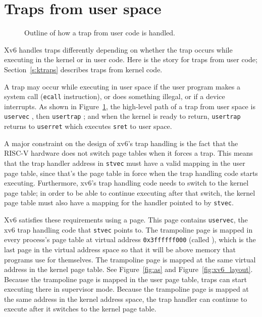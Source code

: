 \section{Traps from user space}
\begin{figure}[t]
  \begin{center}
    
  \end{center}
\caption{Outline of how a trap from user code is handled.}
\label{fig:usertrap}
\end{figure}

Xv6 handles traps differently depending on whether
the trap occurs while
executing in the kernel or in user code. Here is the
story for traps from user code; Section~\ref{s:ktraps}
describes traps from kernel code.

A trap may occur while executing in user space if the
user program makes a
system call ({\tt ecall} instruction), or does something
illegal, or if a device interrupts.
As shown in Figure~\ref{fig:usertrap}, the high-level path of a trap from user space is
{\tt uservec}
,
then {\tt usertrap}
;
and when the kernel is ready to return,
{\tt usertrap}
returns to
{\tt userret}
which executes {\tt sret}
to user space.


A major constraint on the design of xv6's trap handling is the fact
that the RISC-V hardware does not switch page tables when it forces a
trap. This means that the trap handler
address in {\tt stvec} must have a valid
mapping in the user page table, since that's the page table in force
when the trap handling code starts executing. Furthermore, xv6's trap
handling code needs to switch to the kernel page table; in order to be
able to continue executing after that switch, the kernel page table
must also have a mapping for the handler pointed to by {\tt stvec}.

Xv6 satisfies these requirements using a  page.
This page contains {\tt uservec}, the xv6 trap handling code
that {\tt stvec} points to. The trampoline page is mapped in
every process's page table at virtual address {\tt 0x3ffffff000}
(called ),
which is the last page in the virtual address space so that it will
be above memory that programs use for themselves.
The trampoline page is mapped at the same virtual address
in the kernel page table. See Figure~\ref{fig:as} and
Figure~\ref{fig:xv6_layout}. Because the trampoline page is mapped in
the user page table, traps can start
executing there in supervisor mode. Because the trampoline page is
mapped at the same address in the kernel address space, the trap handler
can continue to execute after it switches to the kernel page
table.

